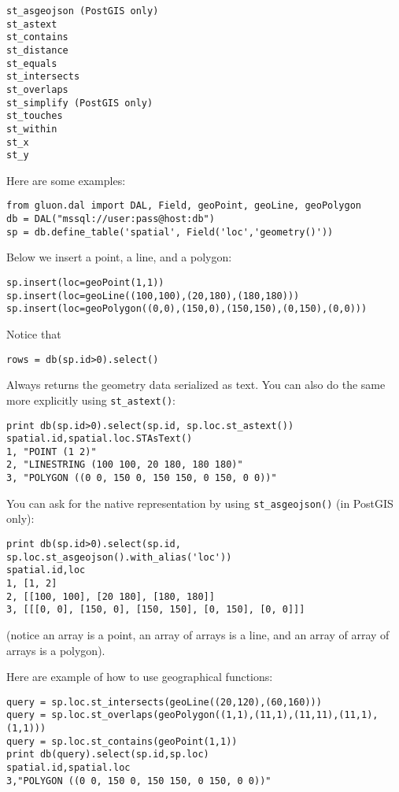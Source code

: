 \documentclass[justified,sixbynine,notoc]{tufte-book}
\def\ft{\small\tt}
\begin{document}
\begin{fullwidth}
\begin{lstlisting}
st_asgeojson (PostGIS only)
st_astext
st_contains
st_distance
st_equals
st_intersects
st_overlaps
st_simplify (PostGIS only)
st_touches
st_within
st_x
st_y
\end{lstlisting}

Here are some examples:

\begin{lstlisting}
from gluon.dal import DAL, Field, geoPoint, geoLine, geoPolygon
db = DAL("mssql://user:pass@host:db")
sp = db.define_table('spatial', Field('loc','geometry()'))
\end{lstlisting}

Below we insert a point, a line, and a polygon:
\begin{lstlisting}
sp.insert(loc=geoPoint(1,1))
sp.insert(loc=geoLine((100,100),(20,180),(180,180)))
sp.insert(loc=geoPolygon((0,0),(150,0),(150,150),(0,150),(0,0)))
\end{lstlisting}

Notice that
\begin{lstlisting}
rows = db(sp.id>0).select()
\end{lstlisting}

Always returns the geometry data serialized as text.
You can also do the same more explicitly using {\ft st\_astext()}:

\begin{lstlisting}
print db(sp.id>0).select(sp.id, sp.loc.st_astext())
spatial.id,spatial.loc.STAsText()
1, "POINT (1 2)"
2, "LINESTRING (100 100, 20 180, 180 180)"
3, "POLYGON ((0 0, 150 0, 150 150, 0 150, 0 0))"
\end{lstlisting}

You can ask for the native representation by using {\ft st\_asgeojson()} (in PostGIS only):

\begin{lstlisting}
print db(sp.id>0).select(sp.id, sp.loc.st_asgeojson().with_alias('loc'))
spatial.id,loc
1, [1, 2]
2, [[100, 100], [20 180], [180, 180]]
3, [[[0, 0], [150, 0], [150, 150], [0, 150], [0, 0]]]
\end{lstlisting}

(notice an array is a point, an array of arrays is a line, and an array of array of arrays is a polygon).

Here are example of how to use geographical functions:

\begin{lstlisting}
query = sp.loc.st_intersects(geoLine((20,120),(60,160)))
query = sp.loc.st_overlaps(geoPolygon((1,1),(11,1),(11,11),(11,1),(1,1)))
query = sp.loc.st_contains(geoPoint(1,1))
print db(query).select(sp.id,sp.loc)
spatial.id,spatial.loc
3,"POLYGON ((0 0, 150 0, 150 150, 0 150, 0 0))"
\end{lstlisting}


\end{fullwidth}
\end{document}
